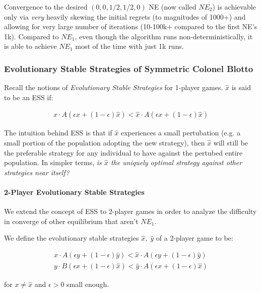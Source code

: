 \documentclass [11pt]{article}
\begin{document}
Convergence to the desired $(0, 0, 1/2, 1/2, 0)$ NE (now called $NE_2$) is achievable only via \textit{very} heavily skewing the initial regrets (to magnitudes of 1000+) and allowing for very large number of iterations (10-100k+ compared to the first NE's 1k). Compared to $NE_1$, even though the algorithm runs non-deterministically, it is able to achieve $NE_1$ most of the time with just 1k runs.

\subsubsection{Evolutionary Stable Strategies of Symmetric Colonel Blotto}

Recall the notions of \textit{Evolutionary Stable Strategies} for 1-player games. $\hat{x}$ is said to be an ESS if:

\begin{align}
  x \cdot A (\epsilon x + (1 - \epsilon) \hat{x}) < \hat{x} \cdot A (\epsilon x + (1 - \epsilon) \hat{x})
\end{align}

The intuition behind ESS is that if $\hat{x}$ experiences a small pertubation (e.g. a small portion of the population adopting the new strategy), then $\hat{x}$ will still be the preferable strategy for any individual to have against the pertubed entire population. In simpler terms, \textit{is $\hat{x}$ the uniquely optimal strategy against other strategies near itself?}

\paragraph{2-Player Evolutionary Stable Strategies}

We extend the concept of ESS to 2-player games in order to analyze the difficulty in converge of other equilibrium that aren't $NE_1$.

We define the evolutionary stable strategies $\hat{x}, \; \hat{y}$ of a 2-player game to be:

\begin{align}
  x \cdot A (\epsilon y + (1 - \epsilon) \hat{y}) < \hat{x} \cdot A (\epsilon y + (1 - \epsilon) \hat{y}) \\
  y \cdot B (\epsilon x + (1 - \epsilon) \hat{x}) < \hat{y} \cdot A (\epsilon x + (1 - \epsilon) \hat{x})
\end{align}

for $x \neq \hat{x}$ and $\epsilon > 0$ small enough.
\end{document}
